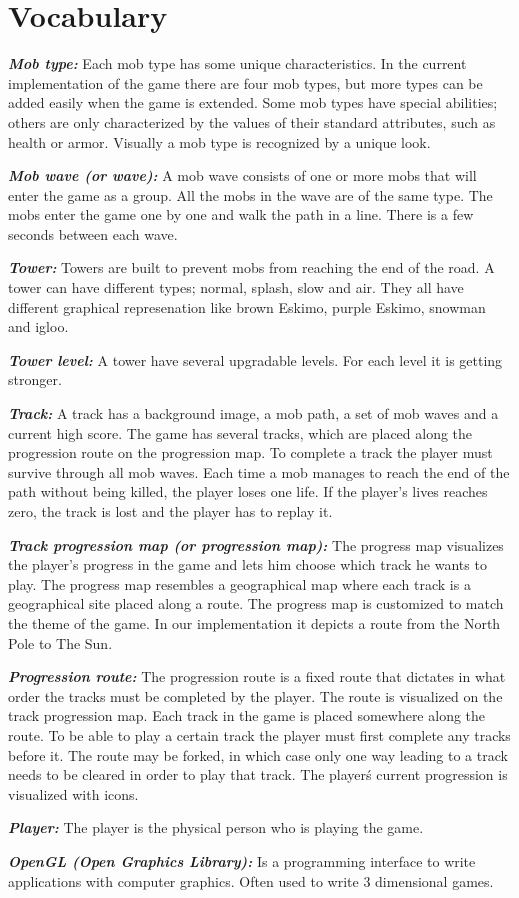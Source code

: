 \section*{Vocabulary}

\emph{\bf{Mob type:}} Each mob type has some unique characteristics. In the current implementation of the game there are four mob types, but more types can be added easily when the game is extended. Some mob types have special abilities; others are only characterized by the values of their standard attributes, such as health or armor. Visually a mob type is recognized by a unique look.

\emph{\bf{Mob wave (or wave):}} A mob wave consists of one or more mobs that will enter the game as a group. All the mobs in the wave are of the same type. The mobs enter the game one by one and walk the path in a line. There is a few seconds between each wave.

\emph{\bf{Tower:}} Towers are built to prevent mobs from reaching the end of the road. A tower can have different types; normal, splash, slow and air. They all have different graphical represenation like brown Eskimo, purple Eskimo, snowman and igloo.

\emph{\bf{Tower level:}} A tower have several upgradable levels. For each level it is getting stronger. 

\emph{\bf{Track:}} A track has a background image, a mob path, a set of mob waves and a current high score. The game has several tracks, which are placed along the progression route on the progression map. To complete a track the player must survive through all mob waves. Each time a mob manages to reach the end of the path without being killed, the player loses one life. If the player's lives reaches zero, the track is lost and the player has to replay it.

\emph{\bf{Track progression map (or progression map):}} The progress map visualizes the player's progress in the game and lets him choose which track he wants to play. The progress map resembles a geographical map where each track is a geographical site placed along a route. The progress map is customized to match the theme of the game. In our implementation it depicts a route from the North Pole to The Sun.

\emph{\bf{Progression route:}} The progression route is a fixed route that dictates in what order the tracks must be completed by the player. The route is visualized on the track progression map. Each track in the game is placed somewhere along the route. To be able to play a certain track the player must first complete any tracks before it. The route may be forked, in which case only one way leading to a track needs to be cleared in order to play that track. The player\'s current progression is visualized with icons.

\emph{\bf{Player:}} The player is the physical person who is playing the game.

\emph{\bf{OpenGL (Open Graphics Library):}} Is a programming interface to write applications with computer graphics. Often used to write 3 dimensional games.  